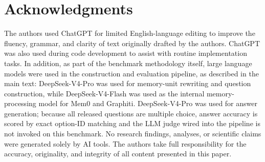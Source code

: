 \section*{Acknowledgments}

The authors used ChatGPT for limited English-language editing to improve the fluency, grammar, and clarity of text originally drafted by the authors. ChatGPT was also used during code development to assist with routine implementation tasks. In addition, as part of the benchmark methodology itself, large language models were used in the construction and evaluation pipeline, as described in the main text: DeepSeek-V4-Pro was used for memory-unit rewriting and question construction, while DeepSeek-V4-Flash was used as the internal memory-processing model for Mem0 and Graphiti. DeepSeek-V4-Pro was used for answer generation; because all released questions are multiple choice, answer accuracy is scored by exact option-ID matching and the LLM judge wired into the pipeline is not invoked on this benchmark. No research findings, analyses, or scientific claims were generated solely by AI tools. The authors take full responsibility for the accuracy, originality, and integrity of all content presented in this paper.
